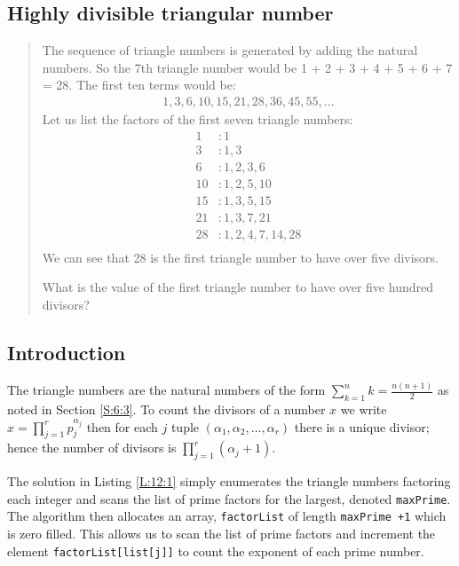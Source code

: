 \documentclass[oneside,12pt]{book}   	%
\newcounter{ex}
\newcounter{pr}
\theoremstyle{definition}
\begin{document}
\begin{spacing}{1.618}
			
	
	\chapter{Highly divisible triangular number}\label{C:12}
	
		\begin{quote}
			The sequence of triangle numbers is generated by adding the natural numbers. So the 7th triangle number would be 1 + 2 + 3 + 4 + 5 + 6 + 7 = 28. The first ten terms would be:
			\begin{alignat*}{4}
				1, 3, 6, 10, 15, 21, 28, 36, 45, 55, \dots
			\end{alignat*}
			Let us list the factors of the first seven triangle numbers:
			\begin{alignat*}{4}
				 1&: 1\\
				 3&: 1,3\\
				 6&: 1,2,3,6\\
				10&: 1,2,5,10\\
				15&: 1,3,5,15\\
				21&: 1,3,7,21\\
				28&: 1,2,4,7,14,28\\
			\end{alignat*}
			We can see that 28 is the first triangle number to have over five divisors.

			What is the value of the first triangle number to have over five hundred divisors?
		\end{quote}
		
		\section{Introduction}
		
			The triangle numbers are the natural numbers of the form $\sum_{k=1}^n k=\frac{n(n+1)}{2}$ as noted in Section \ref{S:6:3}. To count the divisors of a number $x$ we write $x=\prod_{j=1}^r{p_j^{\alpha_j}}$ then for each $j$ tuple $(\alpha_1, \alpha_2, \dots, \alpha_r)$ there is a unique divisor; hence the number of divisors is $\prod_{j=1}^r(\alpha_j+1)$. 
			
			The solution in Listing \ref{L:12:1} simply enumerates the triangle numbers factoring each integer and scans the list of prime factors for the largest, denoted \texttt{maxPrime}. The algorithm then allocates an array, \texttt{factorList} of length \texttt{maxPrime +1} which is zero filled. This allows us to scan the list of prime factors and increment the element \texttt{factorList[list[j]]} to count the exponent of each prime number. 
			

\end{spacing}
\end{document}
